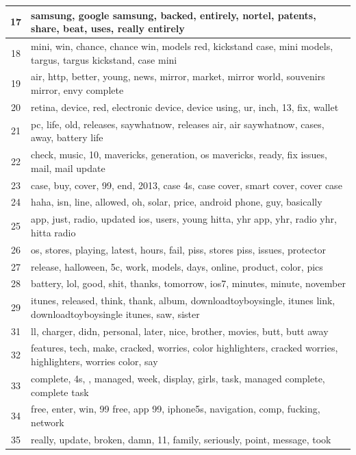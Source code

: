 \begin{longtable}{c p{16cm}}
   17   & samsung, google samsung, backed, entirely, nortel, patents, share, beat, uses, really entirely \\ \midrule
   18   & mini, win, chance, chance win, models red, kickstand case, mini models, targus, targus kickstand, case mini \\ \midrule
   19   & air, http, better, young, news, mirror, market, mirror world, souvenirs mirror, envy complete \\ \midrule
   20   & retina, device, red, electronic device, device using, ur, inch, 13, fix, wallet \\ \midrule
   21   & pc, life, old, releases, saywhatnow, releases air, air saywhatnow, cases, away, battery life \\ \midrule
   22   & check, music, 10, mavericks, generation, os mavericks, ready, fix issues, mail, mail update \\ \midrule
   23   & case, buy, cover, 99, end, 2013, case 4s, case cover, smart cover, cover case \\ \midrule
   24   & haha, isn, line, allowed, oh, solar, price, android phone, guy, basically \\ \midrule
   25   & app, just, radio, updated ios, users, young hitta, yhr app, yhr, radio yhr, hitta radio \\ \midrule
   26   & os, stores, playing, latest, hours, fail, piss, stores piss, issues, protector \\ \midrule
   27   & release, halloween, 5c, work, models, days, online, product, color, pics \\ \midrule
   28   & battery, lol, good, shit, thanks, tomorrow, ios7, minutes, minute, november \\ \midrule
   29   & itunes, released, think, thank, album, downloadtoyboysingle, itunes link, downloadtoyboysingle itunes, saw, sister \\ \midrule
   31   & ll, charger, didn, personal, later, nice, brother, movies, butt, butt away \\ \midrule
   32   & features, tech, make, cracked, worries, color highlighters, cracked worries, highlighters, worries color, say \\ \midrule
   33   & complete, 4s, , managed, week, display, girls, task, managed complete, complete task \\ \midrule
   34   & free, enter, win, 99 free, app 99, iphone5s, navigation, comp, fucking, network \\ \midrule
   35   & really, update, broken, damn, 11, family, seriously, point, message, took \\ \midrule

\end{longtable}
